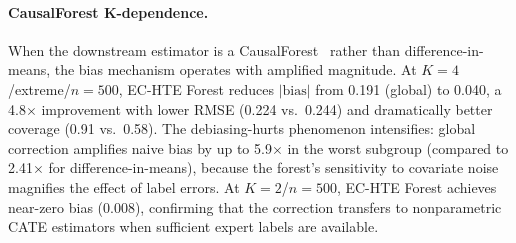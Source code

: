 \paragraph{CausalForest K-dependence.}
When the downstream estimator is a CausalForest~\cite{wager2018causal} rather than difference-in-means, the bias mechanism operates with amplified magnitude.
At $K{=}4$/extreme/$n{=}500$, EC-HTE Forest reduces $|\text{bias}|$ from 0.191 (global) to 0.040, a 4.8$\times$ improvement with lower RMSE (0.224 vs.\ 0.244) and dramatically better coverage (0.91 vs.\ 0.58).
The debiasing-hurts phenomenon intensifies: global correction amplifies naive bias by up to 5.9$\times$ in the worst subgroup (compared to 2.41$\times$ for difference-in-means), because the forest's sensitivity to covariate noise magnifies the effect of label errors.
At $K{=}2$/$n{=}500$, EC-HTE Forest achieves near-zero bias (0.008), confirming that the correction transfers to nonparametric CATE estimators when sufficient expert labels are available.

